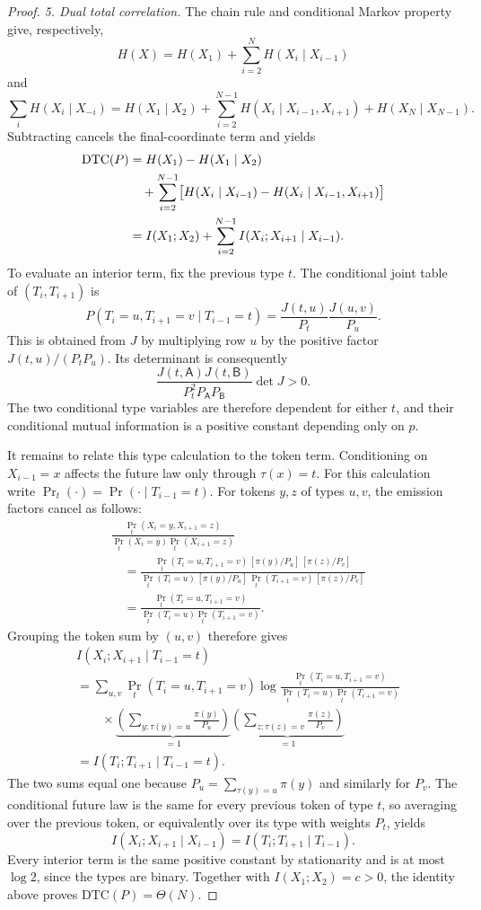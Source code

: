 \begin{proof}
\emph{5. Dual total correlation.}
The chain rule and conditional Markov property give, respectively,
\[
 H(X)=H(X_1)+\sum_{i=2}^NH(X_i\mid X_{i-1})
\]
and
\[
 \sum_iH(X_i\mid X_{-i})
 =H(X_1\mid X_2)
  +\sum_{i=2}^{N-1}H(X_i\mid X_{i-1},X_{i+1})
  +H(X_N\mid X_{N-1}).
\]
Subtracting cancels the final-coordinate term and yields
\begin{align}
 \mathrm{DTC}(P)
 &=H(X_1)-H(X_1\mid X_2)\notag\\
 &\quad+\sum_{i=2}^{N-1}
   \bigl[H(X_i\mid X_{i-1})
         -H(X_i\mid X_{i-1},X_{i+1})\bigr]\notag\\
 &=I(X_1;X_2)+\sum_{i=2}^{N-1}
                   I(X_i;X_{i+1}\mid X_{i-1}).
 \label{app:eq:path-dtc-identity}
\end{align}
To evaluate an interior term, fix the previous type $t$.
The conditional joint table of $(T_i,T_{i+1})$ is
\[
 P(T_i=u,T_{i+1}=v\mid T_{i-1}=t)
 =\frac{J(t,u)}{P_t}\frac{J(u,v)}{P_u}.
\]
This is obtained from $J$ by multiplying row $u$ by the positive factor
$J(t,u)/(P_tP_u)$.  Its determinant is consequently
\[
 \frac{J(t,\mathsf A)J(t,\mathsf B)}
      {P_t^2P_{\mathsf A}P_{\mathsf B}}\det J>0.
\]
The two conditional type variables are therefore dependent for either
$t$, and their conditional mutual information is a positive constant
depending only on $p$.

It remains to relate this type calculation to the token term.
Conditioning on $X_{i-1}=x$ affects the future law only through $\tau(x)=t$.
For this calculation write $\Pr_t(\cdot)=\Pr(\cdot\mid T_{i-1}=t)$.
For tokens $y,z$ of types $u,v$, the emission factors cancel as follows:
\begin{align*}
 &\frac{\Pr_t(X_i=y,X_{i+1}=z)}
        {\Pr_t(X_i=y)\Pr_t(X_{i+1}=z)}\\
 &\quad=
 \frac{\Pr_t(T_i=u,T_{i+1}=v)\,[\pi(y)/P_u]\,[\pi(z)/P_v]}
      {\Pr_t(T_i=u)\,[\pi(y)/P_u]\,
       \Pr_t(T_{i+1}=v)\,[\pi(z)/P_v]}\\
 &\quad=
 \frac{\Pr_t(T_i=u,T_{i+1}=v)}
      {\Pr_t(T_i=u)\Pr_t(T_{i+1}=v)}.
\end{align*}
Grouping the token sum by $(u,v)$ therefore gives
\begin{align*}
 &I(X_i;X_{i+1}\mid T_{i-1}=t)\\
 &=\sum_{u,v}\Pr_t(T_i=u,T_{i+1}=v)
   \log\frac{\Pr_t(T_i=u,T_{i+1}=v)}
             {\Pr_t(T_i=u)\Pr_t(T_{i+1}=v)}\\
 &\qquad\times
   \underbrace{\left(\sum_{y:\tau(y)=u}\frac{\pi(y)}{P_u}\right)}_{=1}
   \underbrace{\left(\sum_{z:\tau(z)=v}\frac{\pi(z)}{P_v}\right)}_{=1}\\
 &=I(T_i;T_{i+1}\mid T_{i-1}=t).
\end{align*}
The two sums equal one because $P_u=\sum_{\tau(y)=u}\pi(y)$ and similarly
for $P_v$.  The conditional future law is the same for every previous token
of type $t$, so averaging over the previous token, or equivalently over its
type with weights $P_t$, yields
\[
 I(X_i;X_{i+1}\mid X_{i-1})
 =I(T_i;T_{i+1}\mid T_{i-1}).
\]
Every interior term is the same positive constant by stationarity and is
at most $\log2$, since the types are binary.
Together with $I(X_1;X_2)=c>0$, the identity above proves
$\mathrm{DTC}(P)=\Theta(N)$.


\end{proof}
